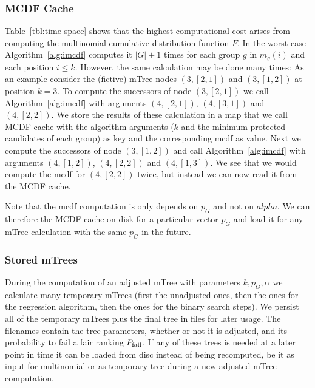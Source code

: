 \subsubsection{MCDF Cache}\label{subsubsec:mcdf-cache}
Table~\ref{tbl:time-space} shows that the highest computational cost arises from computing the multinomial cumulative distribution function $F$.
%
In the worst case Algorithm~\ref{alg:imcdf} computes it $|G|+1$ times for each group $g$ in $m_g(i)$ and each position $i\leq k$.
%
However, the same calculation may be done many times:
%
As an example consider the (fictive) mTree nodes $(3, [2,1])$ and $(3, [1,2])$ at position $k=3$.
%
To compute the successors of node $(3, [2,1])$ we call Algorithm~\ref{alg:imcdf} with arguments $(4,[2,1])$, $(4,[3,1])$ and $(4,[2,2])$.
%
We store the results of these calculation in a map that we call MCDF cache with the algorithm arguments ($k$ and the minimum protected candidates of each group) as key and the corresponding mcdf as value.
%
Next we compute the successors of node $(3, [1,2])$ and call Algorithm~\ref{alg:imcdf} with arguments $(4,[1,2])$, $(4,[2,2])$ and $(4,[1,3])$.
%
We see that we would compute the mcdf for $(4,[2,2])$ twice, but instead we can now read it from the MCDF cache.


Note that the mcdf computation is only depends on $p_G$ and not on $alpha$.
%
We can therefore  the MCDF cache on disk for a particular vector $p_G$ and load it for any mTree calculation with the same $p_G$ in the future.

\subsubsection{Stored mTrees}
\label{subsubsec:stored-mtrees}
During the computation of an adjusted mTree with parameters $k,p_G , \alpha$ we calculate many temporary mTrees (first the unadjusted ones, then the ones for the regression algorithm, then the ones for the binary search steps).
%
We persist all of the temporary mTrees plus the final tree in files for later usage.
%
The filenames contain the tree parameters, whether or not it is adjusted, and its probability to fail a fair ranking $P_{\operatorname{fail}}$.
%
If any of these trees is needed at a later point in time it can be loaded from disc instead of being recomputed, be it as input for multinomial \algoFAIR or as temporary tree during a new adjusted mTree computation.

